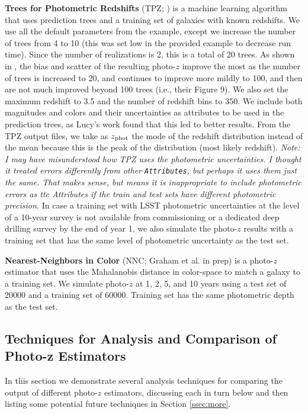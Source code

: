 \documentclass[DM,lsstdraft,toc]{lsstdoc}
\begin{document}
{\bf Trees for Photometric Redshifts} (TPZ; \citealt{2013ascl.soft04011C,2013MNRAS.432.1483C}) is a machine learning algorithm that uses prediction trees and a training set of galaxies with known redshifts. We use all the default parameters from the example, except we increase the number of trees from 4 to 10 (this was set low in the provided example to decrease run time). Since the number of realizations is 2, this is a total of 20 trees. As shown in \cite{2013MNRAS.432.1483C}, the bias and scatter of the resulting photo-$z$ improve the most as the number of trees is increased to 20, and continues to improve more mildly to 100, and then are not much improved beyond 100 trees (i.e., their Figure 9). We also set the maximum redshift to 3.5 and the number of redshift bins to 350. We include both magnitudes and colors and their uncertainties as attributes to be used in the prediction trees, as Lucy's work found that this led to better results. From the TPZ output files, we take as $z_{\rm phot}$ the mode of the redshift distribution instead of the mean because this is the peak of the distribution (most likely redshift). {\it Note: I may have misunderstood how TPZ uses the photometric uncertainties. I thought it treated errors differently from other {\tt Attributes}, but perhaps it uses them just the same. That makes sense, but means it is inappropriate to include photometric errors as {ttc Attributes} if the train and test sets have different photometric precision.} In case a training set with LSST photometric uncertainties at the level of a 10-year survey is not available from commissioning or a dedicated deep drilling survey by the end of year 1, we also simulate the photo-$z$ results with a training set that has the same level of photometric uncertainty as the test set.

{\bf Nearest-Neighbors in Color} (NNC; Graham et al. in prep) is a photo-$z$ estimator that uses the Mahalanobis distance in color-space to match a galaxy to a training set. We simulate photo-$z$ at 1, 2, 5, and 10 years using a test set of 20000 and a training set of 60000. Training set has the same photometric depth as the test set.


\subsection{Techniques for Analysis and Comparison of Photo-z Estimators}\label{ssec:comp}

In this section we demonstrate several analysis techniques for comparing the output of different photo-$z$ estimators, discussing each in turn below and then listing some potential future techniques in Section \ref{ssec:more}.
\end{document}

